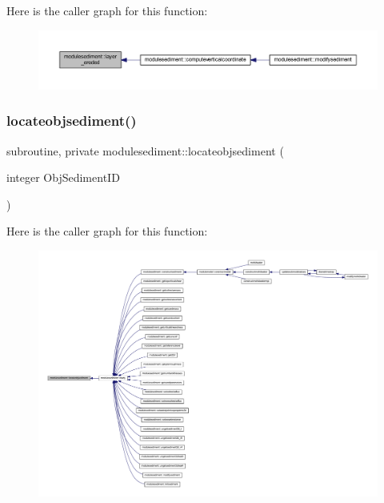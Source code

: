 Here is the caller graph for this function\+:\nopagebreak
\begin{figure}[H]
\begin{center}
\leavevmode
\includegraphics[width=350pt]{namespacemodulesediment_aba4245ac07452ebcf189f0cf9617d234_icgraph}
\end{center}
\end{figure}
\mbox{\label{namespacemodulesediment_a3719cfe21de51d5aff6e236bffdbe06d}} 
\subsubsection{\texorpdfstring{locateobjsediment()}{locateobjsediment()}}
{\footnotesize\ttfamily subroutine, private modulesediment\+::locateobjsediment (\begin{DoxyParamCaption}\item[{integer}]{Obj\+Sediment\+ID }\end{DoxyParamCaption})\hspace{0.3cm}{\ttfamily [private]}}

Here is the caller graph for this function\+:\nopagebreak
\begin{figure}[H]
\begin{center}
\leavevmode
\includegraphics[width=350pt]{namespacemodulesediment_a3719cfe21de51d5aff6e236bffdbe06d_icgraph}
\end{center}
\end{figure}
\mbox{\label{namespacemodulesediment_aac53266b3dac9076f1df37c49e676383}} 
